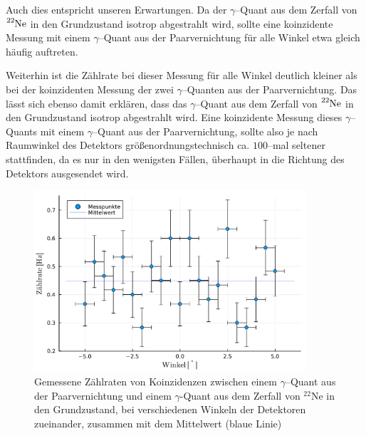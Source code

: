 \documentclass[12pt,a4paper]{scrartcl}
\numberwithin{equation}{section} %
\begin{document}
Auch dies entspricht unseren Erwartungen. Da der $\gamma$--Quant aus dem Zerfall von $\ce{^{22}Ne}$ in den Grundzustand isotrop abgestrahlt wird, sollte eine koinzidente Messung mit einem $\gamma$--Quant aus der Paarvernichtung für alle Winkel etwa gleich häufig auftreten.

Weiterhin ist die Zählrate bei dieser Messung für alle Winkel deutlich kleiner als bei der koinzidenten Messung der zwei $\gamma$--Quanten aus der Paarvernichtung. Das lässt sich ebenso damit erklären, dass das $\gamma$--Quant aus dem Zerfall von $\ce{^{22}Ne}$ in den Grundzustand isotrop abgestrahlt wird. Eine koinzidente Messung dieses $\gamma$--Quants mit einem $\gamma$--Quant aus der Paarvernichtung, sollte also je nach Raumwinkel des Detektors größenordnungstechnisch ca. $100$--mal seltener stattfinden, da es nur in den wenigsten Fällen, überhaupt in die Richtung des Detektors ausgesendet wird.

\begin{figure}[h]
	\centering
	\includegraphics[width=0.9\textwidth]{../media/B3.4/plot1275.pdf}
	\caption{Gemessene Zählraten von Koinzidenzen zwischen einem $\gamma$--Quant aus der Paarvernichtung und einem $\gamma$-Quant aus dem Zerfall von $^{22}$Ne in den Grundzustand, bei verschiedenen Winkeln der Detektoren zueinander, zusammen mit dem Mittelwert (blaue Linie)}
	\label{fig:plot1275}
\end{figure}
\end{document}
